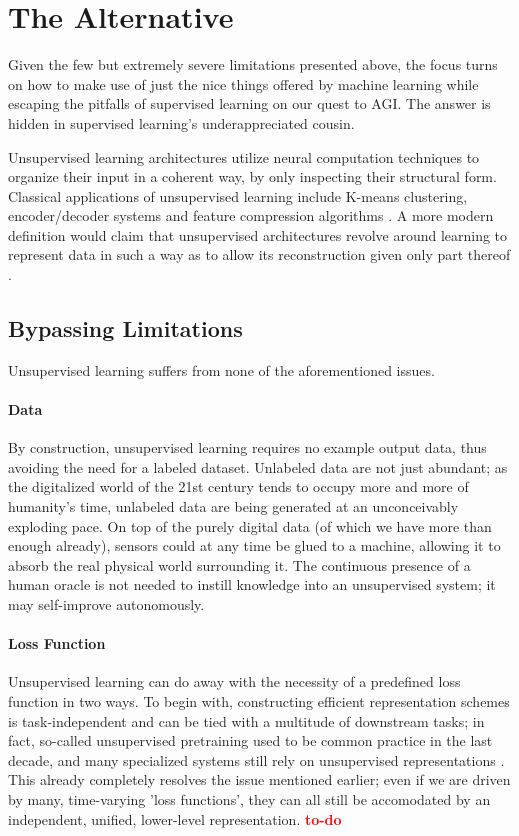 \documentclass[]{article}
\newcommand\todo{\textcolor{red}{\bf{to-do}}}
\begin{document}
\section{The Alternative}
Given the few but extremely severe limitations presented above, the focus turns on how to make use of just the nice things offered by machine learning while escaping the pitfalls of supervised learning on our quest to AGI. The answer is hidden in supervised learning's underappreciated cousin.

Unsupervised learning architectures utilize neural computation techniques to organize their input in a coherent way, by only inspecting their structural form. Classical applications of unsupervised learning include K-means clustering, encoder/decoder systems and feature compression algorithms \cite{Ghahramani2004}. A more modern definition would claim that unsupervised architectures revolve around learning to represent data in such a way as to allow its reconstruction given only part thereof \cite{lecun2016}.

\subsection{Bypassing Limitations}
Unsupervised learning suffers from none of the aforementioned issues. 

\paragraph{Data}
By construction, unsupervised learning requires no example output data, thus avoiding the need for a labeled dataset. Unlabeled data are not just abundant; as the digitalized world of the 21st century tends to occupy more and more of humanity's time, unlabeled data are being generated at an unconceivably exploding pace. On top of the purely digital data (of which we have more than enough already), sensors could at any time be glued to a machine, allowing it to absorb the real physical world surrounding it. The continuous presence of a human oracle is not needed to instill knowledge into an unsupervised system; it may self-improve autonomously.

\paragraph{Loss Function}
Unsupervised learning can do away with the necessity of a predefined loss function in two ways. To begin with, constructing efficient representation schemes is task-independent and can be tied with a multitude of downstream tasks; in fact, so-called unsupervised pretraining used to be common practice in the last decade, and many specialized systems still rely on unsupervised representations \cite{DBLP:journals/jmlr/ErhanBCMVB10}. This already completely resolves the issue mentioned earlier; even if we are driven by many, time-varying 'loss functions', they can all still be accomodated by an independent, unified, lower-level representation. \todo
\end{document}
